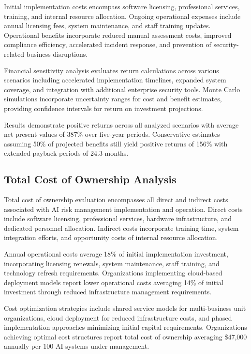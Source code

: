 \documentclass[11pt,letterpaper]{article}
\begin{document}
Initial implementation costs encompass software licensing, professional services, training, and internal resource allocation. Ongoing operational expenses include annual licensing fees, system maintenance, and staff training updates. Operational benefits incorporate reduced manual assessment costs, improved compliance efficiency, accelerated incident response, and prevention of security-related business disruptions.

Financial sensitivity analysis evaluates return calculations across various scenarios including accelerated implementation timelines, expanded system coverage, and integration with additional enterprise security tools. Monte Carlo simulations incorporate uncertainty ranges for cost and benefit estimates, providing confidence intervals for return on investment projections.

Results demonstrate positive returns across all analyzed scenarios with average net present values of 387\% over five-year periods. Conservative estimates assuming 50\% of projected benefits still yield positive returns of 156\% with extended payback periods of 24.3 months.

\subsection{Total Cost of Ownership Analysis}

Total cost of ownership evaluation encompasses all direct and indirect costs associated with AI risk management implementation and operation. Direct costs include software licensing, professional services, hardware infrastructure, and dedicated personnel allocation. Indirect costs incorporate training time, system integration efforts, and opportunity costs of internal resource allocation.

Annual operational costs average 18\% of initial implementation investment, incorporating licensing renewals, system maintenance, staff training, and technology refresh requirements. Organizations implementing cloud-based deployment models report lower operational costs averaging 14\% of initial investment through reduced infrastructure management requirements.

Cost optimization strategies include shared service models for multi-business unit organizations, cloud deployment for reduced infrastructure costs, and phased implementation approaches minimizing initial capital requirements. Organizations achieving optimal cost structures report total cost of ownership averaging \$47,000 annually per 100 AI systems under management.
\end{document}
